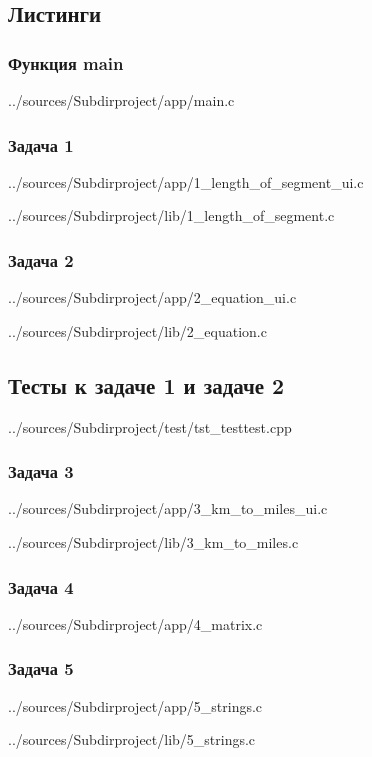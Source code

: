 \documentclass[12pt,a4paper]{report}
\begin{document}
\subsection*{Листинги}
\subsubsection{Функция main}

{../sources/Subdirproject/app/main.c}
\newpage

\subsubsection{Задача 1}

{../sources/Subdirproject/app/1_length_of_segment_ui.c}


{../sources/Subdirproject/lib/1_length_of_segment.c}
\newpage

\subsubsection{Задача 2}

{../sources/Subdirproject/app/2_equation_ui.c}


{../sources/Subdirproject/lib/2_equation.c}
\newpage

\subsection{Тесты к задаче 1 и задаче 2}

{../sources/Subdirproject/test/tst_testtest.cpp}
\newpage

\subsubsection{Задача 3}

{../sources/Subdirproject/app/3_km_to_miles_ui.c}


{../sources/Subdirproject/lib/3_km_to_miles.c}
\newpage

\subsubsection{Задача 4}

{../sources/Subdirproject/app/4_matrix.c}
\newpage

\subsubsection{Задача 5}

{../sources/Subdirproject/app/5_strings.c}


{../sources/Subdirproject/lib/5_strings.c}
\end{document}
